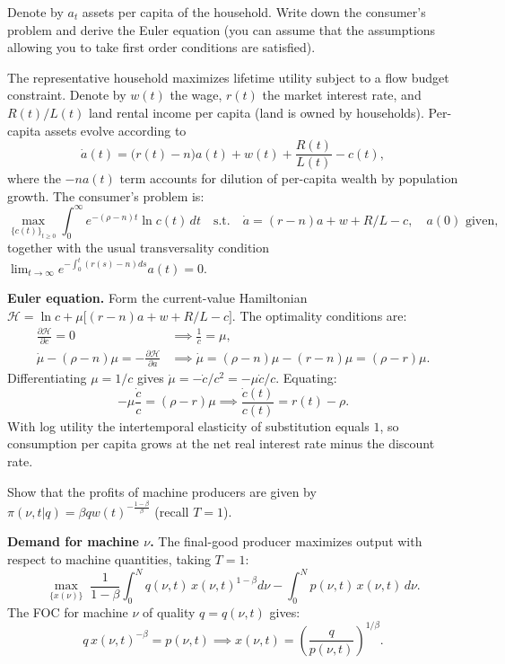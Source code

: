 \documentclass[11pt]{exam}
\begin{document}
\begin{questions}

\question Denote by $a_{t}$ assets per capita of the household. Write down the consumer's problem and derive the Euler equation (you can assume that the assumptions allowing you to take first order conditions are satisfied).
\begin{solution}
The representative household maximizes lifetime utility subject to a flow budget constraint.  Denote by $w(t)$ the wage, $r(t)$ the market interest rate, and $R(t)/L(t)$ land rental income per capita (land is owned by households).  Per-capita assets evolve according to
\[
	\dot{a}(t) = \bigl(r(t)-n\bigr)a(t) + w(t) + \frac{R(t)}{L(t)} - c(t),
\]
where the $-na(t)$ term accounts for dilution of per-capita wealth by population growth.  The consumer's problem is:
\[
	\max_{\{c(t)\}_{t\ge0}}\int_{0}^{\infty}e^{-(\rho-n)t}\ln c(t)\,dt
	\quad\text{s.t.}\quad \dot{a}=(r-n)a+w+R/L-c, \quad a(0)\text{ given},
\]
together with the usual transversality condition $\lim_{t\to\infty}e^{-\int_0^t(r(s)-n)ds}a(t)=0$.

\textbf{Euler equation.}  Form the current-value Hamiltonian $\mathcal{H}=\ln c + \mu\bigl[(r-n)a+w+R/L-c\bigr]$.  The optimality conditions are:
\begin{align*}
	\frac{\partial \mathcal{H}}{\partial c}=0 &\implies \frac{1}{c}=\mu, \\
	\dot{\mu}-(\rho-n)\mu = -\frac{\partial\mathcal{H}}{\partial a} &\implies \dot{\mu}=(\rho-n)\mu-(r-n)\mu=(\rho-r)\mu.
\end{align*}
Differentiating $\mu=1/c$ gives $\dot{\mu}=-\dot{c}/c^{2}=-\mu\dot{c}/c$.  Equating:
\[
	-\mu\frac{\dot{c}}{c}=(\rho-r)\mu \implies
	\boxed{\frac{\dot{c}(t)}{c(t)}=r(t)-\rho.}
\]
With log utility the intertemporal elasticity of substitution equals $1$, so consumption per capita grows at the net real interest rate minus the discount rate.
\end{solution}

\question Show that the profits of machine producers are given by $\pi(\nu,t|q)=\beta q w(t)^{-\frac{1-\beta}{\beta}}$ (recall $T=1$).
\begin{solution}
\textbf{Demand for machine $\nu$.}  The final-good producer maximizes output with respect to machine quantities, taking $T=1$:
\[
	\max_{\{x(\nu)\}}\;\frac{1}{1-\beta}\!\int_{0}^{N}q(\nu,t)\,x(\nu,t)^{1-\beta}d\nu - \int_{0}^{N}p(\nu,t)\,x(\nu,t)\,d\nu.
\]
The FOC for machine $\nu$ of quality $q=q(\nu,t)$ gives:
\[
	q\,x(\nu,t)^{-\beta} = p(\nu,t) \implies x(\nu,t) = \left(\frac{q}{p(\nu,t)}\right)^{\!1/\beta}.
\]


\end{solution}
\end{questions}
\end{document}
